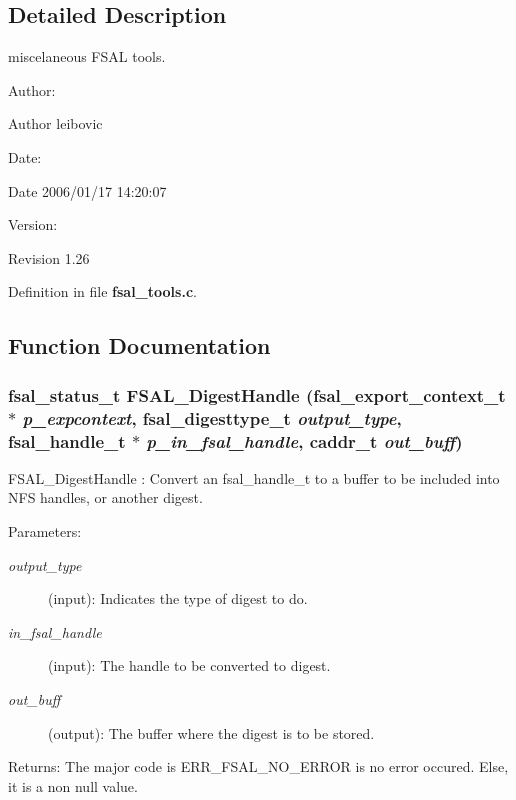 \subsection{Detailed Description}
miscelaneous FSAL tools. 

\begin{Desc}
\item[Author:]\end{Desc}
\begin{Desc}
\item[Author]leibovic \end{Desc}
\begin{Desc}
\item[Date:]\end{Desc}
\begin{Desc}
\item[Date]2006/01/17 14:20:07 \end{Desc}
\begin{Desc}
\item[Version:]\end{Desc}
\begin{Desc}
\item[Revision]1.26 \end{Desc}


Definition in file {\bf fsal\_\-tools.c}.

\subsection{Function Documentation}
\subsubsection[{FSAL\_\-DigestHandle}]{\setlength{\rightskip}{0pt plus 5cm}fsal\_\-status\_\-t FSAL\_\-DigestHandle (fsal\_\-export\_\-context\_\-t $\ast$ {\em p\_\-expcontext}, \/  fsal\_\-digesttype\_\-t {\em output\_\-type}, \/  fsal\_\-handle\_\-t $\ast$ {\em p\_\-in\_\-fsal\_\-handle}, \/  caddr\_\-t {\em out\_\-buff})}\label{fsal__tools_8c_4b019cc6729ad10ecdc7a51f4ee29011}


FSAL\_\-DigestHandle : Convert an fsal\_\-handle\_\-t to a buffer to be included into NFS handles, or another digest.

\begin{Desc}
\item[Parameters:]
\begin{description}
\item[{\em output\_\-type}](input): Indicates the type of digest to do. \item[{\em in\_\-fsal\_\-handle}](input): The handle to be converted to digest. \item[{\em out\_\-buff}](output): The buffer where the digest is to be stored.\end{description}
\end{Desc}
\begin{Desc}
\item[Returns:]The major code is ERR\_\-FSAL\_\-NO\_\-ERROR is no error occured. Else, it is a non null value. \end{Desc}


